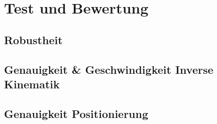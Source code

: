 \section{Test und Bewertung}
\label{sec:test}

\subsection{Robustheit}
\subsection{Genauigkeit \& Geschwindigkeit Inverse Kinematik}
\subsection{Genauigkeit Positionierung}

